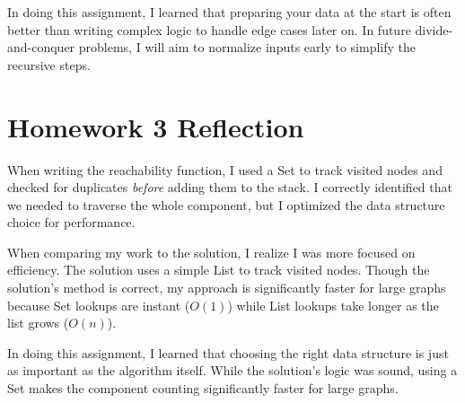 \documentclass[11pt, letterpaper]{article}
\begin{document}
In doing this assignment, I learned that preparing your data at the start is often better than writing complex logic to handle edge cases later on. In future divide-and-conquer problems, I will aim to normalize inputs early to simplify the recursive steps.

\section*{Homework 3 Reflection}

When writing the reachability function, I used a Set to track visited nodes and checked for duplicates \textit{before} adding them to the stack. I correctly identified that we needed to traverse the whole component, but I optimized the data structure choice for performance.

When comparing my work to the solution, I realize I was more focused on efficiency. The solution uses a simple List to track visited nodes. Though the solution's method is correct, my approach is significantly faster for large graphs because Set lookups are instant ($O(1)$) while List lookups take longer as the list grows ($O(n)$).

In doing this assignment, I learned that choosing the right data structure is just as important as the algorithm itself. While the solution's logic was sound, using a Set makes the component counting significantly faster for large graphs.
\end{document}
